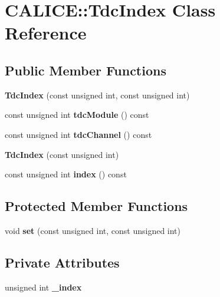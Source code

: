 \section{CALICE::TdcIndex Class Reference}
\label{classCALICE_1_1TdcIndex}
\subsection*{Public Member Functions}
\begin{DoxyCompactItemize}
\item 
{\bfseries TdcIndex} (const unsigned int, const unsigned int)\label{classCALICE_1_1TdcIndex_a738f7f801a98797aca2230def176fd03}

\item 
const unsigned int {\bfseries tdcModule} () const \label{classCALICE_1_1TdcIndex_a3421cdcbbdf20f86d88f61c311624c2c}

\item 
const unsigned int {\bfseries tdcChannel} () const \label{classCALICE_1_1TdcIndex_a30f92c56a4ed1d856dd758fb9a1e12ce}

\item 
{\bfseries TdcIndex} (const unsigned int)\label{classCALICE_1_1TdcIndex_a72c3f77205c47e38607e2926e8088070}

\item 
const unsigned int {\bfseries index} () const \label{classCALICE_1_1TdcIndex_afbe2ae4dd14c9081d86c8425cd22e148}

\end{DoxyCompactItemize}
\subsection*{Protected Member Functions}
\begin{DoxyCompactItemize}
\item 
void {\bfseries set} (const unsigned int, const unsigned int)\label{classCALICE_1_1TdcIndex_a224187082dd245dce7870c9d0bc0d1c4}

\end{DoxyCompactItemize}
\subsection*{Private Attributes}
\begin{DoxyCompactItemize}
\item 
unsigned int {\bfseries \_\-index}\label{classCALICE_1_1TdcIndex_a680c6d9365daba7bb081c8f75fd0f856}

\end{DoxyCompactItemize}
